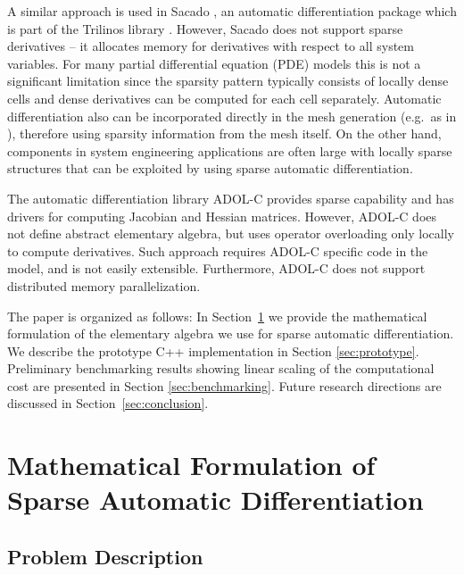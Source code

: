 \documentclass[10pt]{ijnam}
\theoremstyle{definition}
\begin{document}
A similar approach is used in Sacado \cite{phipps2012}, an automatic differentiation
package which is part of the Trilinos library \cite{heroux2005}. However, Sacado does 
not support sparse derivatives -- it allocates memory for derivatives 
with respect to all system variables. 
For many partial differential equation (PDE) models this is not a significant limitation since the
sparsity pattern typically consists of locally dense cells and dense derivatives can be computed 
for each cell separately.
Automatic differentiation also can be incorporated directly in the mesh generation 
(e.g.~as in \cite{schoberl2014}), therefore using sparsity information from the mesh itself. 
On the other hand, components in system engineering applications are often large with locally sparse structures that can be exploited by using sparse automatic differentiation.

The automatic differentiation library ADOL-C \cite{walther2012} provides sparse
capability and has drivers for computing Jacobian and Hessian matrices. However, ADOL-C  does 
not define abstract elementary algebra, but uses operator overloading only locally to compute 
derivatives. Such approach requires ADOL-C specific code in the model, and is not easily extensible. 
Furthermore, ADOL-C does not support distributed memory parallelization.

The paper is organized as follows: In Section~\ref{sec:ad} we provide the mathematical
formulation of the elementary algebra we use for sparse automatic differentiation. We
describe the prototype C++ implementation in Section \ref{sec:prototype}. Preliminary 
benchmarking results showing linear scaling of the computational cost 
are presented in Section \ref{sec:benchmarking}. Future 
research directions are discussed in Section~\ref{sec:conclusion}.

\section{Mathematical Formulation of Sparse Automatic Differentiation}
\label{sec:ad}

\subsection{Problem Description}
\end{document}
